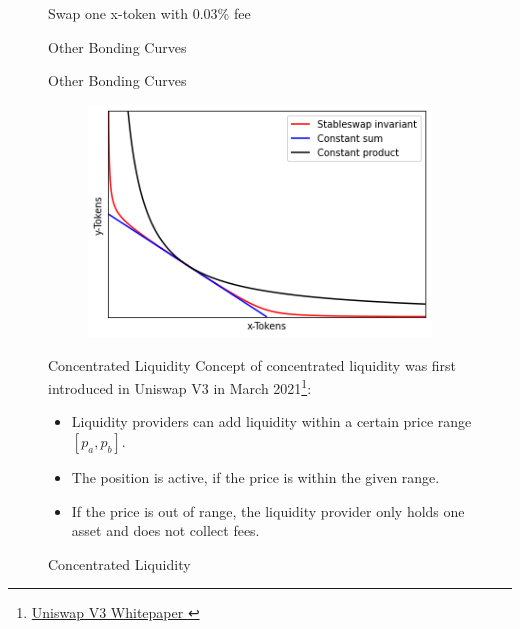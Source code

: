 \documentclass[]{beamer}
\begin{document}
\begin{minipage}{0.5\textwidth}
\begin{figure}[h!]
\begin{frame}{Swap one x-token with 0.03\% fee}
\begin{frame}{Other Bonding Curves}
\begin{frame}{Other Bonding Curves}
	\begin{figure}
		\includegraphics[scale=0.6]{../assets/images/bonding-curves.png}
	\end{figure}
\end{frame}


\begin{frame}{Concentrated Liquidity}
	Concept of concentrated liquidity was first introduced in Uniswap V3 in March 2021\footnote{\href{https://uniswap.org/whitepaper-v3.pdf}{Uniswap V3 Whitepaper \link}}:
	\begin{itemize}
		\item<2-> Liquidity providers can add liquidity within a certain price range $[p_a, p_b]$.
		\item<3-> The position is active, if the price is within the given range.
		\item<4-> If the price is out of range, the liquidity provider only holds one asset and does not collect fees.
	\end{itemize}
	\vspace{0.5cm}
\end{frame}


\begin{frame}{Concentrated Liquidity}
	\begin{figure}[h!]
		\begin{center}
			
		\end{center}
	\end{figure}	
\end{frame}



\end{frame}
\end{frame}
\end{figure}
\end{minipage}
\end{document}
